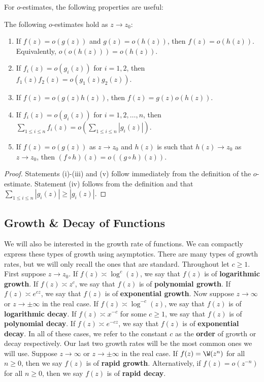         For $o$-estimates, the following properties are useful:

        \begin{proposition}\label{prop:Little_Oh_manipulations}
            The following $o$-estimates hold as $z \to z_{0}$:
            \begin{enumerate}[label=(\roman*)]
              \item If $f(z) = o(g(z))$ and $g(z) = o(h(z))$, then $f(z) = o(h(z))$. Equivalently, $o(o(h(z))) = o(h(z))$.
              \item If $f_{i}(z) = o(g_{i}(z))$ for $i = 1,2$, then $f_{1}(z)f_{2}(z) = o(g_{1}(z)g_{2}(z))$.
              \item If $f(z) = o(g(z)h(z))$, then $f(z) = g(z)o(h(z))$.
              \item If $f_{i}(z) = o(g_{i}(z))$ for $i = 1,2,\ldots,n$, then $\sum_{1 \le i \le n}f_{i}(z) = o\left(\sum_{1 \le i \le n}|g_{i}(z)|\right)$.
              \item If $f(z) = o(g(z))$ as $z \to z_{0}$ and $h(z)$ is such that $h(z) \to z_{0}$ as $z \to z_{0}$, then $(f \circ h)(z) = o((g \circ h)(z))$.
            \end{enumerate}
        \end{proposition}
        \begin{proof}
          Statements (i)-(iii) and (v) follow immediately from the definition of the $o$-estimate. Statement (iv) follows from the definition and that $\sum_{1 \le i \le n}|g_{i}(z)| \ge |g_{i}(z)|$.
        \end{proof}
      \subsection*{Growth \& Decay of Functions}
        We will also be interested in the growth rate of functions. We can compactly express these types of growth using asymptotics. There are many types of growth rates, but we will only recall the ones that are standard. Throughout let $c \ge 1$. First suppose $z \to z_{0}$. If $f(z) \asymp \log^{c}(z)$, we say that $f(z)$ is of \textbf{logarithmic growth}. If $f(z) \asymp z^{c}$, we say that $f(z)$ is of \textbf{polynomial growth}. If $f(z) \asymp e^{cz}$, we say that $f(z)$ is of \textbf{exponential growth}. Now suppose $z \to \infty$ or $z \to \pm\infty$ in the real case. If $f(z) \asymp \log^{-c}(z)$, we say that $f(z)$ is of \textbf{logarithmic decay}. If $f(z) \asymp x^{-c}$ for some $c \ge 1$, we say that $f(z)$ is of \textbf{polynomial decay}. If $f(z) \asymp e^{-cz}$, we say that $f(z)$ is of \textbf{exponential decay}. In all of these cases, we refer to the constant $c$ as the \textbf{order} of growth or decay respectively. Our last two growth rates will be the most common ones we will use. Suppose $z \to \infty$ or $z \to \pm\infty$ in the real case. If $f(z) = \W(z^{n})$ for all $n \ge 0$, then we say $f(z)$ is of \textbf{rapid growth}. Alternatively, if $f(z) = o(z^{-n})$ for all $n \ge 0$, then we say $f(z)$ is of \textbf{rapid decay}.
